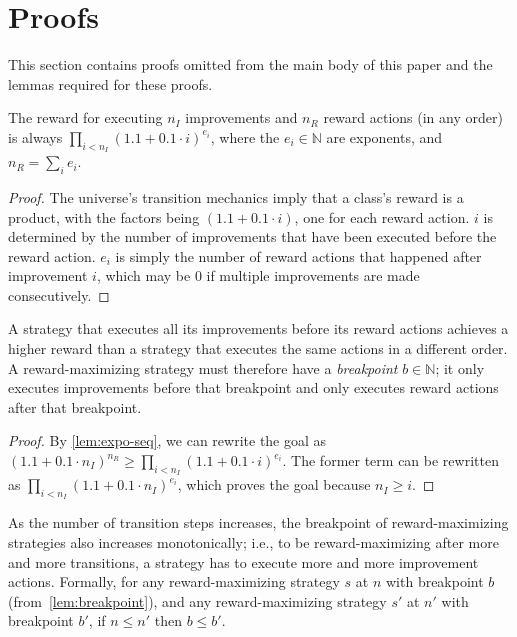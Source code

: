 \section{Proofs}

This section contains proofs omitted from the main body of this paper and the
lemmas required for these proofs.

\begin{lemma}
  \label{lem:expo-seq}
  The reward for executing $n_I$ improvements and $n_R$ reward actions (in any
  order) is always $\prod_{i < n_I} (1.1 + 0.1 \cdot i)^{e_i}$, where the $e_i
    \in \mathbb{N}$ are exponents, and $n_R = \sum_i e_i$.
\end{lemma}

\begin{proof}
  The universe's transition mechanics imply that a class's reward is a
  product, with the factors being $(1.1 + 0.1 \cdot i)$, one for each
  reward action. $i$ is determined by the number of improvements that have been
  executed before the reward action. $e_{i}$ is simply the number of
  reward actions that happened after improvement $i$, which may be $0$ if
  multiple improvements are made consecutively.
\end{proof}

\begin{lemma}
  \label{lem:breakpoint}
  A strategy that executes all its improvements before its reward actions
  achieves a higher reward than a strategy that executes the same actions in a
  different order. A reward-maximizing strategy must therefore have a
  \emph{breakpoint} $b \in \mathbb{N}$; it only executes improvements before
  that breakpoint and only executes reward actions after that breakpoint.
\end{lemma}

\begin{proof}
  By \cref{lem:expo-seq}, we can rewrite the goal as $(1.1 + 0.1 \cdot
    n_I)^{n_R} \ge \prod_{i < n_I} (1.1 + 0.1 \cdot i)^{e_i}$. The former term
  can be rewritten as $\prod_{i < n_I} (1.1 + 0.1 \cdot n_I)^{e_i}$, which
  proves the goal because $n_I \ge i$.
\end{proof}

\begin{lemma}
  \label{lem:breakpoints-increase}
  As the number of transition steps increases, the breakpoint of
  reward-maximizing strategies also increases monotonically; i.e., to be
  reward-maximizing after more and more transitions, a strategy has to execute
  more and more improvement actions. Formally, for any reward-maximizing
  strategy $s$ at $n$ with breakpoint $b$ (from~\cref{lem:breakpoint}), and any
  reward-maximizing strategy $s'$ at $n'$ with breakpoint $b'$, if $n \le n'$
  then $b \le b'$.
\end{lemma}

